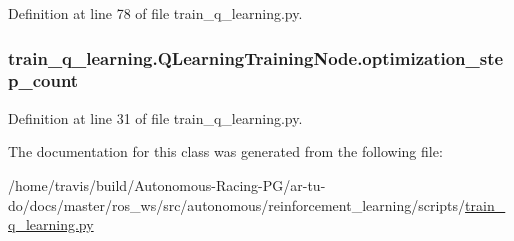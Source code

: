 Definition at line 78 of file train\+\_\+q\+\_\+learning.\+py.

\subsubsection[{\texorpdfstring{optimization\+\_\+step\+\_\+count}{optimization_step_count}}]{\setlength{\rightskip}{0pt plus 5cm}train\+\_\+q\+\_\+learning.\+Q\+Learning\+Training\+Node.\+optimization\+\_\+step\+\_\+count}\hypertarget{classtrain__q__learning_1_1_q_learning_training_node_ac921e45077a91450fd9d01b109bf0a60}{}\label{classtrain__q__learning_1_1_q_learning_training_node_ac921e45077a91450fd9d01b109bf0a60}


Definition at line 31 of file train\+\_\+q\+\_\+learning.\+py.



The documentation for this class was generated from the following file\+:\begin{DoxyCompactItemize}
\item 
/home/travis/build/\+Autonomous-\/\+Racing-\/\+P\+G/ar-\/tu-\/do/docs/master/ros\+\_\+ws/src/autonomous/reinforcement\+\_\+learning/scripts/\hyperlink{train__q__learning_8py}{train\+\_\+q\+\_\+learning.\+py}\end{DoxyCompactItemize}
